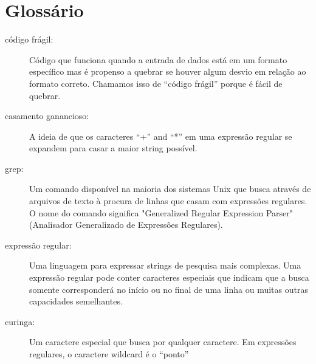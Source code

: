 \section{Glossário}

\begin{description}

\item[código frágil:]
Código que funciona quando a entrada de dados está em um formato específico mas é 
propenso a quebrar se houver algum desvio em relação ao formato correto. Chamamos isso
de ``código frágil'' porque é fácil de quebrar.

\item[casamento ganancioso:]
A ideia de que os caracteres ``+'' and ``*'' em uma expressão regular se expandem 
para casar a maior string possível.

\item[grep:]
Um comando disponível na maioria dos sistemas Unix que busca através de arquivos de texto à 
procura de linhas que casam com expressões regulares. O nome do comando significa "Generalized 
Regular Expression Parser" (Analisador Generalizado de Expressões Regulares).

\item[expressão regular:]
Uma linguagem para expressar strings de pesquisa mais complexas. Uma expressão regular pode
conter caracteres especiais que indicam que a busca somente corresponderá no início ou no final 
de uma linha ou muitas outras capacidades semelhantes.

\item[curinga:]
Um caractere especial que busca por qualquer caractere. Em expressões regulares, o 
caractere wildcard é o ``ponto''


\end{description}

